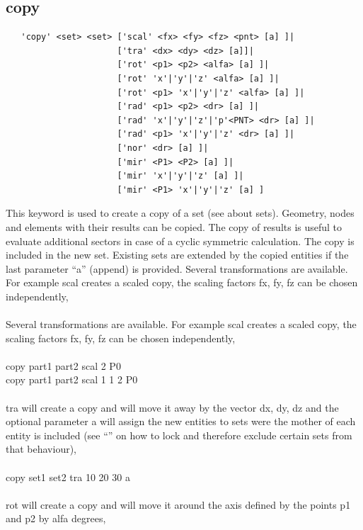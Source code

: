 \documentclass{article}
\begin{document}
\subsection{\label{copy}copy}
\begin{verbatim}
   'copy' <set> <set> ['scal' <fx> <fy> <fz> <pnt> [a] ]|
                      ['tra' <dx> <dy> <dz> [a]]|
                      ['rot' <p1> <p2> <alfa> [a] ]|
                      ['rot' 'x'|'y'|'z' <alfa> [a] ]|
                      ['rot' <p1> 'x'|'y'|'z' <alfa> [a] ]|
                      ['rad' <p1> <p2> <dr> [a] ]|
                      ['rad' 'x'|'y'|'z'|'p'<PNT> <dr> [a] ]|
                      ['rad' <p1> 'x'|'y'|'z' <dr> [a] ]|
                      ['nor' <dr> [a] ]|
                      ['mir' <P1> <P2> [a] ]| 
                      ['mir' 'x'|'y'|'z' [a] ]| 
                      ['mir' <P1> 'x'|'y'|'z' [a] ] 
\end{verbatim}
This keyword is used to create a copy of a set (see  about sets). Geometry, nodes and elements with their results can be copied. The copy of results is useful to evaluate additional sectors in case of a cyclic symmetric calculation. The copy is included in the new set. Existing sets are extended by the copied entities if the last parameter ``a'' (append) is provided. Several transformations are available. For example scal creates a scaled copy, the scaling factors fx, fy, fz can be chosen independently,\\\\
Several transformations are available. For example scal creates a scaled copy, the scaling factors fx, fy, fz can be chosen independently,\\\\
copy part1 part2 scal 2 P0 \\
copy part1 part2 scal 1 1 2 P0\\\\
tra will create a copy and will move it away by the vector dx, dy, dz and the optional parameter a will assign the new entities to sets were the mother of each entity is included (see ``'' on how to lock and therefore exclude certain sets from that behaviour),\\\\
copy set1 set2 tra 10 20 30 a\\\\
rot will create a copy and will move it around the axis defined by the points p1 and p2 by alfa degrees,\\\\
\end{document}
